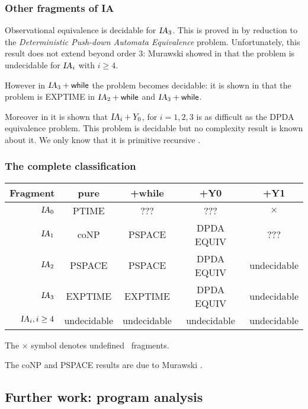 \subsubsection{Other fragments of IA}

Observational equivalence is decidable for $\textsl{IA}_3$. This is
proved in \cite{Ong02} by reduction to the \emph{Deterministic
Push-down Automata Equivalence} problem. Unfortunately, this result
does not extend beyond order $3$: Murawski showed in
\cite{murawski03program} that the problem is undecidable for
$\textsl{IA}_i$ with $i\geq4$.

However in $\textsl{IA}_3 + \textsf{while}$ the problem becomes
decidable: it is shown in \cite{C:MW05} that the problem is EXPTIME
in $\textsl{IA}_2 + \textsf{while}$ and $\textsl{IA}_3 + \textsf{while}$.

Moreover in \cite{C:MOW05} it is shown that $\textsl{IA}_i +Y_0$, for $i
= 1, 2, 3$ is as difficult as the DPDA equivalence problem. This
problem is decidable \citep{DBLP:journals/tcs/Senizergues01} but no
complexity result is known about it. We only know that it is
primitive recursive \citep{stirling02}.

\subsubsection{The complete classification}
\begin{center}
\begin{tabular}{rcccc}
Fragment  & pure & +while & +Y0 & +Y1 \\ \hline \hline
$\textsl{IA}_0$ & PTIME & ??? & ??? & $\times$  \\
$\textsl{IA}_1$ & coNP & PSPACE & DPDA EQUIV & ??? \\
$\textsl{IA}_2$ & PSPACE & PSPACE & DPDA EQUIV & undecidable \\
$\textsl{IA}_3$ &EXPTIME & EXPTIME & DPDA EQUIV & undecidable \\
$\textsl{IA}_i, i \geq 4$  & undecidable & undecidable & undecidable
& undecidable
\end{tabular}
\end{center}

The $\times$ symbol denotes undefined \ialgol\ fragments.

The coNP and PSPACE results are due to Murawski \citep{Mur04b}.

\subsection{Further work: program analysis}

